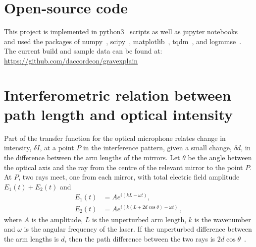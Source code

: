 \documentclass[paper-main.tex]{subfiles}
\begin{document}
\section{Open-source code}
\label{app:code}
This project is implemented in python3~\cite{python} scripts as well as jupyter notebooks~\cite{jupyter}~\cite{ipython} and used the packages of numpy~\cite{numpy}, scipy~\cite{scipy}, matplotlib~\cite{matplotlib}, tqdm~\cite{tqdm}, and logmmse~\cite{logmmse}.
The current build and sample data can be found at:
\url{https://github.com/daccordeon/gravexplain}



\section{Interferometric relation between path length and optical intensity}
\label{app:intensity_derivation}

Part of the transfer function for the optical microphone relates change in intensity, $\delta I$, at a point $P$ in the interference pattern, given a small change, $\delta d$, in the difference between the arm lengths of the mirrors. 
Let $\theta$ be the angle between the optical axis and the ray from the centre of the relevant mirror to the point $P$. 
At $P$, two rays meet, one from each mirror, with total electric field amplitude $E_1(t) + E_2(t)$ and 
\begin{align}
    E_1(t) &= A e^{i (k L - \omega t)},                       \label{eqn:E1} \\
    E_2(t) &= A e^{i (k (L + 2 d \cos{\theta}) - \omega t)}\,  \label{eqn:E2}, 
\end{align}
where $A$ is the amplitude, $L$ is the unperturbed arm length, $k$ is the wavenumber and $\omega$ is the angular frequency of the laser. 
If the unperturbed difference between the arm lengths is $d$, then the path difference between the two rays is $2 d \cos{\theta}$~\cite{fringes:online}.
\end{document}
